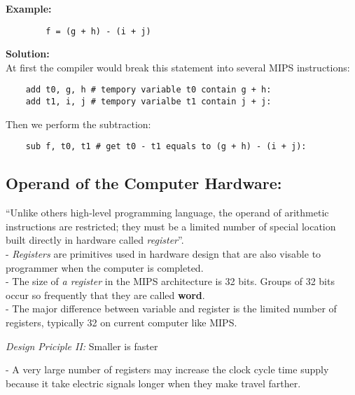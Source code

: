 \documentclass[10pt]{article}
\newcommand{\quotes}[1]{``#1''}
\begin{document}
	\textbf{Example: } \\
	\begin{center}
		\begin{verbatim}
		f = (g + h) - (i + j)
		\end{verbatim}
	\end{center}
	\textbf{Solution: } \\
	At first the compiler would break this statement into several MIPS instructions: \\
	\begin{verbatim}
	add t0, g, h # tempory variable t0 contain g + h:
	add t1, i, j # tempory varialbe t1 contain j + j:
	\end{verbatim}
	Then we perform the subtraction: \\
	\begin{verbatim}
	sub f, t0, t1 # get t0 - t1 equals to (g + h) - (i + j):
	\end{verbatim}

	\subsection{Operand of the Computer Hardware: }
	\quotes{Unlike others high-level programming language, the operand of arithmetic instructions are restricted; they must be a limited number of special location built directly in hardware called \textit{register}}. \\

	- \textit{Registers} are primitives used in hardware design that are also visable to programmer when the computer is completed. \\
	- The size of \textit{a register} in the MIPS architecture is 32 bits. Groups of 32 bits occur so frequently that they are called \textbf{word}. \\
	- The major difference between variable and register is the limited number of registers, typically 32 on current computer like MIPS. \\

	\begin{mybox}
		\begin{center}
			\textit{Design Priciple II:} Smaller is faster
		\end{center}
	\end{mybox}

	- A very large number of registers may increase the clock cycle time supply because it take electric signals longer when they make travel farther. \\
\end{document}

